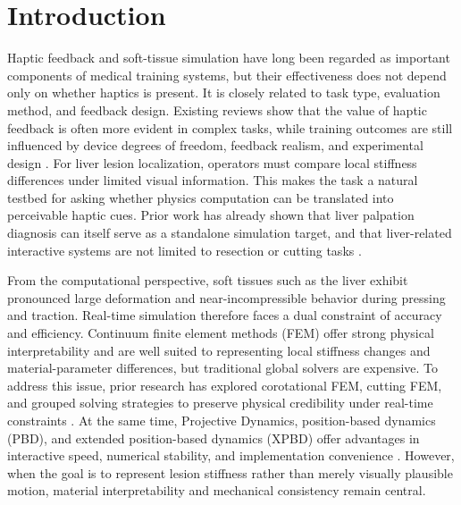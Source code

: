 \documentclass{ieeeaccess}
\begin{document}
\titlepgskip=-21pt
\maketitle

\section{Introduction}
Haptic feedback and soft-tissue simulation have long been regarded as important components of medical training systems, but their effectiveness does not depend only on whether haptics is present. It is closely related to task type, evaluation method, and feedback design. Existing reviews show that the value of haptic feedback is often more evident in complex tasks, while training outcomes are still influenced by device degrees of freedom, feedback realism, and experimental design \cite{overtoom2019haptic,rangarajan2020systematic,escobar2016review}. For liver lesion localization, operators must compare local stiffness differences under limited visual information. This makes the task a natural testbed for asking whether physics computation can be translated into perceivable haptic cues. Prior work has already shown that liver palpation diagnosis can itself serve as a standalone simulation target, and that liver-related interactive systems are not limited to resection or cutting tasks \cite{westwood2012haptic,hongyu2021interactive}.

From the computational perspective, soft tissues such as the liver exhibit pronounced large deformation and near-incompressible behavior during pressing and traction. Real-time simulation therefore faces a dual constraint of accuracy and efficiency. Continuum finite element methods (FEM) offer strong physical interpretability and are well suited to representing local stiffness changes and material-parameter differences, but traditional global solvers are expensive. To address this issue, prior research has explored corotational FEM, cutting FEM, and grouped solving strategies to preserve physical credibility under real-time constraints \cite{bui2019corotational,wang2025group}. At the same time, Projective Dynamics, position-based dynamics (PBD), and extended position-based dynamics (XPBD) offer advantages in interactive speed, numerical stability, and implementation convenience \cite{bouaziz2023projective,liu2016towards,bender2014survey,muller2007position,macklin2016xpbd}. However, when the goal is to represent lesion stiffness rather than merely visually plausible motion, material interpretability and mechanical consistency remain central.
\end{document}
